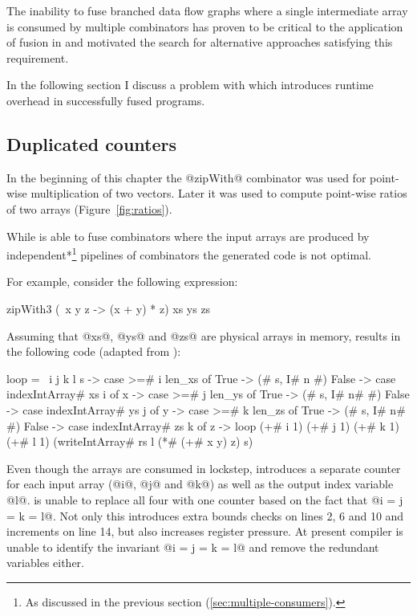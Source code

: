 \documentclass[preamble.tex]{subfiles}
\begin{document}
The inability to fuse branched data flow graphs where a single intermediate array is consumed by multiple combinators has proven to be critical to the application of fusion in \DPH and motivated the search for alternative approaches satisfying this requirement.

In the following section I discuss a problem with \StreamFusion which introduces runtime overhead in successfully fused programs.


\subsection{Duplicated counters}
\label{sec:duplicated-counters}

In the beginning of this chapter the @zipWith@ combinator was used for point-wise multiplication of two vectors. Later it was used to compute point-wise ratios of two arrays (Figure~\ref{fig:ratios}).

While \StreamFusion is able to fuse  combinators where the input arrays are produced by \*independent*\footnote{As discussed in the previous section (\ref{sec:multiple-consumers}).} pipelines of combinators the generated code is not optimal.

For example, consider the following expression:

\begin{hscode}
zipWith3 (\ x y z -> (x + y) * z) xs ys zs
\end{hscode}

Assuming that @xs@, @ys@ and @zs@ are physical arrays in memory, \StreamFusion results in the following  code (adapted from \cite{FlowFusion}):

\begin{hscode}[numbers=left]
loop = \ i j k l s ->
  case >=# i len_xs of
    True  -> (# s, I# n #)
    False ->
      case indexIntArray# xs i of x ->
        case >=# j len_ys of
          True  -> (# s, I# n# #)
          False ->
            case indexIntArray# ys j of y ->
              case >=# k len_zs of
                True  -> (# s, I# n# #)
                False ->
                  case indexIntArray# zs k of z ->
                    loop (+# i 1) (+# j 1) (+# k 1) (+# l 1)
                      (writeIntArray# rs l (*# (+# x y) z) s)
\end{hscode}

Even though the arrays are consumed in lockstep, \StreamFusion introduces a separate counter for each input array (@i@, @j@ and @k@) as well as the output index variable @l@. \StreamFusion is unable to replace all four with one counter based on the fact that @i = j = k = l@. Not only this introduces extra bounds checks on lines 2, 6 and 10 and increments on line 14, but also increases register pressure. At present \GHC compiler is unable to identify the invariant @i = j = k = l@ and remove the redundant variables either.
\end{document}

